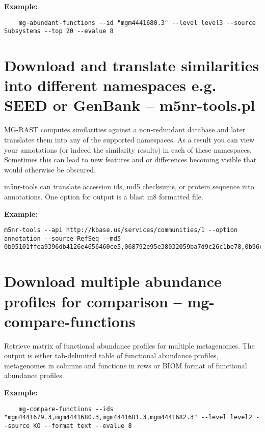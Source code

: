 \textbf{Example:}
\begin{lstlisting}
    mg-abundant-functions --id "mgm4441680.3" --level level3 --source Subsystems --top 20 --evalue 8
\end{lstlisting}
\section{Download and translate similarities into different namespaces e.g. SEED or GenBank -- m5nr-tools.pl}

MG-RAST computes similarities against a non-redundant database \cite{M5NR} and later translates them into any of the supported namespaces. As a result you can view your annotations (or indeed the similarity results) in each of these namespaces. Sometimes this can lead to new features and or differences becoming visible that would otherwise be obscured.

m5nr-tools can translate accession ids, md5 checksums, or protein sequence into annotations. 
One option for output is a blast m8 formatted file.


\textbf{Example:}
\begin{lstlisting}
m5nr-tools --api http://kbase.us/services/communities/1 --option annotation --source RefSeq --md5 0b95101ffea9396db4126e4656460ce5,068792e95e38032059ba7d9c26c1be78,0b96c92ce600d8b2427eedbc221642f1
\end{lstlisting}

\section{Download multiple abundance profiles for comparison --  mg-compare-functions}

Retrieve matrix of functional abundance profiles for multiple metagenomes.
The output is either  tab-delimited table of functional abundance profiles, metagenomes in columns and functions in rows or BIOM format of functional abundance profiles.

\textbf{Example:}
\begin{lstlisting}
    mg-compare-functions --ids "mgm4441679.3,mgm4441680.3,mgm4441681.3,mgm4441682.3" --level level2 --source KO --format text --evalue 8
\end{lstlisting}






